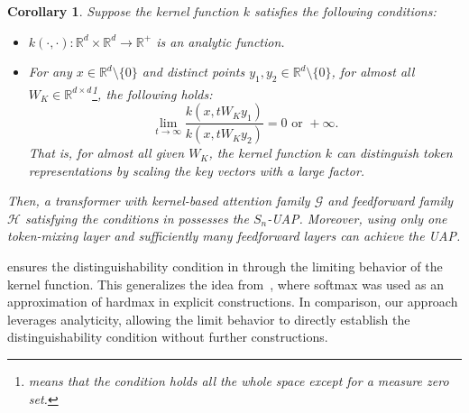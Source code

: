 \documentclass{article}
\newtheorem{corollary}{Corollary}
\newcommand{\ql}[1]{{\footnotesize\textcolor{red}{QL: #1}}}
\begin{document}
\begin{corollary}
    \label{thm:kernel}
    Suppose the kernel function $k$ satisfies the following conditions:
    \begin{itemize}
        \item $k(\cdot,\cdot):\mathbb R^{d}\times \mathbb R^{d}\to \mathbb R^+$ is an analytic function.

        \item For any $x\in\mathbb{R}^d\setminus\{0\}$ and distinct points $y_1, y_2\in\mathbb{R}^d\setminus\{0\}$, for  almost all $W_K\in\mathbb{R}^{d\times d}$\footnote{means that the condition holds all the whole space except for a measure zero set.}, the following holds:
        \begin{equation}
 \lim_{t\to \infty}\frac{k(x, tW_Ky_1)}{k(x, tW_Ky_2)}= 0  \text{ or } +\infty.
        \end{equation}
        That is, for almost all given $W_K$, the kernel function $k$ can distinguish token representations by scaling the key vectors with a large factor.

    \end{itemize}
    Then, a transformer with kernel-based attention family $\mathcal{G}$ and feedforward family $\mathcal{H}$ satisfying the conditions in  possesses the ${S}_n$-UAP. Moreover, using only one token-mixing layer and sufficiently many feedforward layers
    can achieve the UAP.
\end{corollary}

 ensures the distinguishability condition in  through the limiting behavior of the kernel function. This generalizes the idea from~\cite{yun2019transformers,yun2020n}, where softmax was used as an approximation of hardmax in explicit constructions. In comparison, our approach leverages analyticity, allowing the limit behavior to directly establish the distinguishability condition without further constructions.
\end{document}
